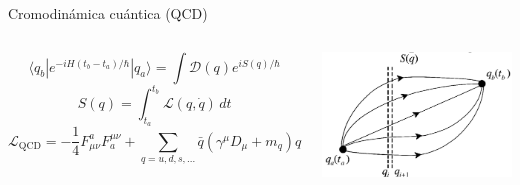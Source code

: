 \documentclass{beamer}
\begin{document}
\begin{frame}{Cromodinámica cuántica (QCD)}
  \begin{columns}
    \begin{equation*}
      \langle q_b | e^{-iH(t_b - t_a)/\hbar} | q_a \rangle = \int \mathcal{D}(q) e^{i S(q)/\hbar}
    \end{equation*}
    \begin{equation*}
      S(q) = \int_{t_a}^{t_b} \mathcal{L}(q, \dot{q})\,dt
    \end{equation*}
    \vspace{1em}
    \begin{equation*}
      \mathcal{L}_{\text{QCD}} = -\frac{1}{4} F_{\mu\nu}^a F^{\mu\nu}_a + \sum_{q=u,d,s,...} \bar{q}(\gamma^\mu D_\mu + m_q)q
    \end{equation*}

    \centering
    \includegraphics[width=\linewidth]{figures/qcd_path_integral.png}
  \end{columns}
\end{frame}
\end{document}
